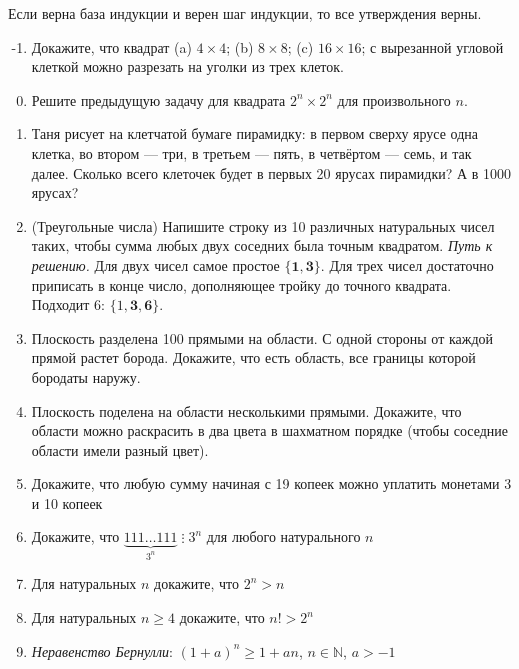 \documentclass{article}
\begin{document}
Если верна база индукции и верен шаг индукции, то все утверждения верны.

\begin{enumerate}[label*=\protect\fbox{\arabic{enumi}}]
	
\setcounter{enumi}{-2}
	
\item Докажите, что квадрат (a) $4 \times 4$; (b) $8 \times 8$; (c) $16 \times 16$; с вырезанной угловой клеткой можно разрезать на уголки из трех клеток.

\item Решите предыдущую задачу для квадрата $2^n \times 2^n$ для произвольного $n$.

\item Таня рисует на клетчатой бумаге пирамидку: в первом сверху ярусе одна клетка, во втором — три, в третьем — пять, в четвёртом — семь, и так далее. Сколько всего клеточек будет в первых 20 ярусах пирамидки? А в 1000 ярусах?

\item  (Треугольные числа) Напишите строку из 10 различных натуральных чисел таких, чтобы сумма любых двух соседних была точным квадратом. \textit{Путь к решению.} Для двух чисел самое простое $\{\textbf{1}, \textbf{3}\}$. Для трех чисел достаточно приписать в конце число, дополняющее тройку до точного квадрата. Подходит 6: $\{1, \textbf{3}, \textbf{6}\}$.
\item Плоскость разделена 100 прямыми на области. С одной стороны от каждой прямой растет борода. Докажите, что есть область, все границы которой бородаты наружу.

\item Плоскость поделена на области несколькими прямыми. Докажите, что области можно раскрасить в  два цвета в шахматном порядке (чтобы соседние области имели разный цвет).

\item Докажите, что любую сумму начиная с 19 копеек можно уплатить монетами 3 и 10 копеек

\item Докажите, что $\underbrace{111\dots111}_{3^n}\;\vdots\; 3^n$ для любого натурального $n$

\item Для натуральных $n$ докажите, что $2^n > n$

\item Для натуральных $n \geqslant 4$ докажите, что $n! > 2^n$

\item \textit{Неравенство Бернулли}: $(1+a)^n\ge 1+an$, $n \in \mathbb{N}$, $a > - 1$


\end{enumerate}
\end{document}

